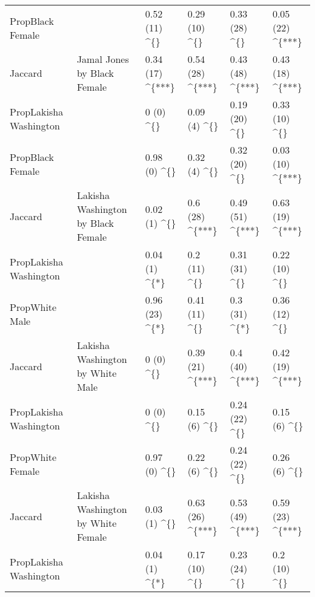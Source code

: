 \begin{table}
\begin{tabular}{llllll}
PropBlack Female &  & 0.52 (11) \textasciicircum{}\{\} & 0.29 (10) \textasciicircum{}\{\} & 0.33 (28) \textasciicircum{}\{\} & 0.05 (22) \textasciicircum{}\{***\}\\

Jaccard & \multirow{-3}{*}{\raggedright\arraybackslash Jamal Jones by Black Female} & 0.34 (17) \textasciicircum{}\{***\} & 0.54 (28) \textasciicircum{}\{***\} & 0.43 (48) \textasciicircum{}\{***\} & 0.43 (18) \textasciicircum{}\{***\}\\
\cmidrule{1-6}
PropLakisha Washington &  & 0 (0) \textasciicircum{}\{\} & 0.09 (4) \textasciicircum{}\{\} & 0.19 (20) \textasciicircum{}\{\} & 0.33 (10) \textasciicircum{}\{\}\\

PropBlack Female &  & 0.98 (0) \textasciicircum{}\{\} & 0.32 (4) \textasciicircum{}\{\} & 0.32 (20) \textasciicircum{}\{\} & 0.03 (10) \textasciicircum{}\{***\}\\

Jaccard & \multirow{-3}{*}{\raggedright\arraybackslash Lakisha Washington by Black Female} & 0.02 (1) \textasciicircum{}\{\} & 0.6 (28) \textasciicircum{}\{***\} & 0.49 (51) \textasciicircum{}\{***\} & 0.63 (19) \textasciicircum{}\{***\}\\
\cmidrule{1-6}
PropLakisha Washington &  & 0.04 (1) \textasciicircum{}\{*\} & 0.2 (11) \textasciicircum{}\{\} & 0.31 (31) \textasciicircum{}\{\} & 0.22 (10) \textasciicircum{}\{\}\\

PropWhite Male &  & 0.96 (23) \textasciicircum{}\{*\} & 0.41 (11) \textasciicircum{}\{\} & 0.3 (31) \textasciicircum{}\{*\} & 0.36 (12) \textasciicircum{}\{\}\\

Jaccard & \multirow{-3}{*}{\raggedright\arraybackslash Lakisha Washington by White Male} & 0 (0) \textasciicircum{}\{\} & 0.39 (21) \textasciicircum{}\{***\} & 0.4 (40) \textasciicircum{}\{***\} & 0.42 (19) \textasciicircum{}\{***\}\\
\cmidrule{1-6}
PropLakisha Washington &  & 0 (0) \textasciicircum{}\{\} & 0.15 (6) \textasciicircum{}\{\} & 0.24 (22) \textasciicircum{}\{\} & 0.15 (6) \textasciicircum{}\{\}\\

PropWhite Female &  & 0.97 (0) \textasciicircum{}\{\} & 0.22 (6) \textasciicircum{}\{\} & 0.24 (22) \textasciicircum{}\{\} & 0.26 (6) \textasciicircum{}\{\}\\

Jaccard & \multirow{-3}{*}{\raggedright\arraybackslash Lakisha Washington by White Female} & 0.03 (1) \textasciicircum{}\{\} & 0.63 (26) \textasciicircum{}\{***\} & 0.53 (49) \textasciicircum{}\{***\} & 0.59 (23) \textasciicircum{}\{***\}\\
\cmidrule{1-6}
PropLakisha Washington &  & 0.04 (1) \textasciicircum{}\{*\} & 0.17 (10) \textasciicircum{}\{\} & 0.23 (24) \textasciicircum{}\{\} & 0.2 (10) \textasciicircum{}\{\}\\


\end{tabular}
\end{table}
